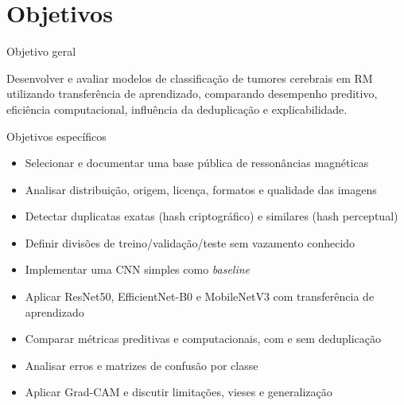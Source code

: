 \documentclass[aspectratio=169]{beamer}
\begin{document}
\section{Objetivos}
\begin{frame}{Objetivo geral}
  \begin{block}{}
    Desenvolver e avaliar modelos de classificação de tumores cerebrais em RM utilizando transferência de aprendizado, comparando desempenho preditivo, eficiência computacional, influência da deduplicação e explicabilidade.
  \end{block}
\end{frame}

\begin{frame}{Objetivos específicos}
  \begin{itemize}
    \item Selecionar e documentar uma base pública de ressonâncias magnéticas
    \item Analisar distribuição, origem, licença, formatos e qualidade das imagens
    \item Detectar duplicatas exatas (hash criptográfico) e similares (hash perceptual)
    \item Definir divisões de treino/validação/teste sem vazamento conhecido
    \item Implementar uma CNN simples como \textit{baseline}
    \item Aplicar ResNet50, EfficientNet-B0 e MobileNetV3 com transferência de aprendizado
    \item Comparar métricas preditivas e computacionais, com e sem deduplicação
    \item Analisar erros e matrizes de confusão por classe
    \item Aplicar Grad-CAM e discutir limitações, vieses e generalização
  \end{itemize}
\end{frame}

\end{document}
